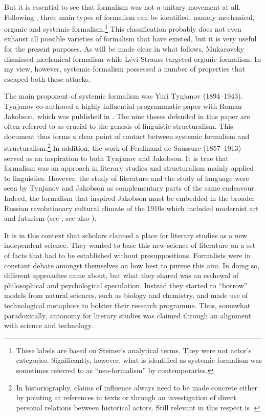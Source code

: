 \documentclass[output=paper]{langscibook}
\begin{document}
But it is essential to see that formalism was not a unitary movement at all. Following \citet{Steiner1984}, three main types of formalism can be identified, namely mechanical, organic and systemic formalism.\footnote{These labels are based on Steiner's analytical terms. They were not actor’s categories. Significantly, however, what is identified as systemic formalism was sometimes referred to as ``neo-formalism'' by contemporaries.} This classification probably does not even exhaust all possible varieties of formalism that have existed, but it is very useful for the present purposes. As will be made clear in what follows, Mukarovsky dismissed mechanical formalism while Lévi-Strauss targeted or\-gan\-ic formalism. In my view, however, systemic formalism possessed a number of properties that escaped both these attacks. 

The main proponent of systemic formalism was Yuri Tynjanov (1894--1943). Tynjanov co-authored a highly influential programmatic paper with Roman Ja\-kob\-son, which was published in \citeyear{Tyjanov1928}. The nine theses defended in this paper are often referred to as crucial to the genesis of linguistic structuralism. This document thus forms a clear point of contact between systemic formalism and structuralism.\footnote{In historiography, claims of influence always need to be made concrete either by pointing at references in texts or through an investigation of direct personal relations between historical actors. Still relevant in this respect is \citet{Koerner1989}.} In addition, the work of Ferdinand de Saussure (1857--1913) served as an inspiration to both Tynjanov and Jakobson. It is true that formalism was an approach in literary studies and structuralism mainly applied to linguistics. However, the study of literature and the study of language were seen by Tynjanov and Jakobson as complementary parts of the same endeavour. Indeed, the formalism that inspired Jakobson must be embedded in the broader Russian revolutionary cultural climate of the 1910s which included modernist art and futurism (see \citealt[32--33]{Holenstein1975}; see also \citealt{Karstens2017lonely}). 

It is in this context that scholars claimed a place for literary studies as a new independent science. They wanted to base this new science of literature on a set of facts that had to be established without presuppositions. Formalists were in constant debate amongst themselves on how best to pursue this aim. In doing so, different approaches came about, but what they shared was an eschewal of philosophical and psychological speculation. Instead they started to ``borrow'' models from natural sciences, such as biology and chemistry, and made use of technological metaphors to bolster their research programme. Thus, somewhat paradoxically, autonomy for literary studies was claimed through an alignment with science and technology. 
\end{document}
